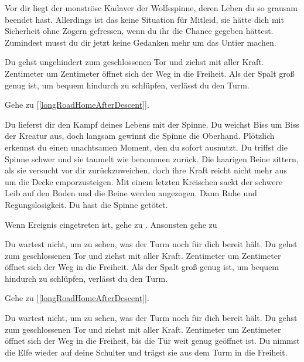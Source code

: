 
Vor dir liegt der monströse Kadaver der Wolfsspinne, deren Leben du so grausam beendet hast. Allerdings ist das keine Situation für Mitleid, sie hätte dich mit Sicherheit ohne Zögern gefressen, wenn du ihr die Chance gegeben hättest. Zumindest musst du dir jetzt keine Gedanken mehr um das Untier machen.

Du gehst ungehindert zum geschlossenen Tor und ziehst mit aller Kraft. Zentimeter um Zentimeter öffnet sich der Weg in die Freiheit. Als der Spalt groß genug ist, um bequem hindurch zu schlüpfen, verlässt du den Turm.

Gehe zu [\ref{longRoadHomeAfterDescent}].


Du lieferst dir den Kampf deines Lebens mit der Spinne. Du weichst Biss um Biss der Kreatur aus, doch langsam gewinnt die Spinne die Oberhand. Plötzlich erkennst du einen unachtsamen Moment, den du sofort ausnutzt. Du triffst die Spinne schwer und sie taumelt wie benommen zurück. Die haarigen Beine zittern, als sie versucht vor dir zurückzuweichen, doch ihre Kraft reicht nicht mehr aus um die Decke emporzusteigen. Mit einem letzten Kreischen sackt der schwere Leib auf den Boden und die Beine werden angezogen. Dann Ruhe und Regungslosigkeit. Du hast die Spinne getötet.

Wenn Ereignis  eingetreten ist, gehe zu . Ansonsten gehe zu 


Du wartest nicht, um zu sehen, was der Turm noch für dich bereit hält. Du gehst zum geschlossenen Tor und ziehst mit aller Kraft. Zentimeter um Zentimeter öffnet sich der Weg in die Freiheit. Als der Spalt groß genug ist, um bequem hindurch zu schlüpfen, verlässt du den Turm.

Gehe zu [\ref{longRoadHomeAfterDescent}].


Du wartest nicht, um zu sehen, was der Turm noch für dich bereit hält. Du gehst zum geschlossenen Tor und ziehst mit aller Kraft. Zentimeter um Zentimeter öffnet sich der Weg in die Freiheit, bis die Tür weit genug geöffnet ist. Du nimmst die Elfe wieder auf deine Schulter und trägst sie aus dem Turm in die Freiheit.

